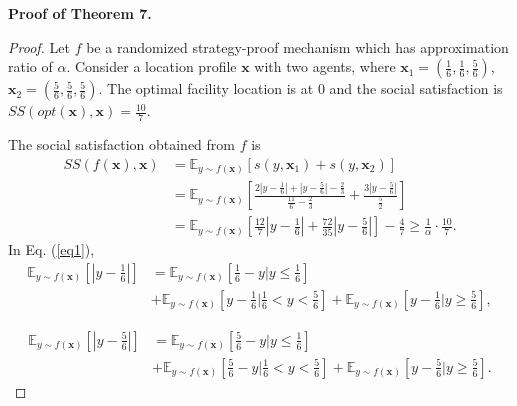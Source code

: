\documentclass[runningheads]{11llncst}
\begin{document}
\noindent
\textbf{Proof of Theorem 7.}
    \begin{proof}
    Let $f$ be a randomized strategy-proof mechanism which has approximation ratio of $\alpha$. Consider a location profile $\textbf{x}$ with two agents, where $\textbf{x}_1=(\frac{1}{6},\frac{1}{6},\frac{5}{6})$, $\textbf{x}_2=(\frac{5}{6},\frac{5}{6},\frac{5}{6})$. The optimal facility location is at 0 and the social satisfaction is $SS(opt(\textbf{x}),\textbf{x})=\frac{10}{7}.$

The social satisfaction  obtained from $f$ is
\begin{equation}\label{eq1}
    \begin{aligned}
        SS(f(\textbf{x}),\textbf{x})&=\mathbb{E}_{y\sim f(\textbf{x})}[s(y,\textbf{x}_1)+s(y,\textbf{x}_2)]\\
        &=\mathbb{E}_{y\sim f(\textbf{x})}\left[\frac{2|y-\frac{1}{6}|+|y-\frac{5}{6}|-\frac{2}{3}}{\frac{11}{6}-\frac{2}{3}}+\frac{3|y-\frac{5}{6}|}{\frac{5}{2}}\right]\\
        &=\mathbb{E}_{y\sim f(\textbf{x})}\left[\frac{12}{7}\left|y-\frac{1}{6}
        \right|+\frac{72}{35}\left|y-\frac{5}{6}\right|\right]-\frac{4}{7}\geq\frac{1}{\alpha}\cdot\frac{10}{7}.
    \end{aligned}
\end{equation}
In Eq. (\ref{eq1}), 
	\begin{equation} \label{eq3}
    \begin{aligned}
        \mathbb{E}_{y\sim f(\textbf{x})}\left[\left|y-\frac{1}{6}\right|\right]&=\mathbb{E}_{y\sim f(\textbf{x})}\left[\frac{1}{6}-y\bigg| y\leq\frac{1}{6}\right]\\
        &+\mathbb{E}_{y\sim f(\textbf{x})}\left[y-\frac{1}{6}\bigg|\frac{1}{6}<y<\frac{5}{6}\right]+\mathbb{E}_{y\sim f(\textbf{x})}\left[y-\frac{1}{6}\bigg|y\geq\frac{5}{6}\right],
    \end{aligned}
		\end{equation}

\begin{equation}\label{eq4}
    \begin{aligned}
       \mathbb{E}_{y\sim f(\textbf{x})}\left[\left|y-\frac{5}{6}\right|\right]
        &=\mathbb{E}_{y\sim f(\textbf{x})}\left[\frac{5}{6}-y\bigg|y\leq\frac{1}{6}\right]\\
        &+\mathbb{E}_{y\sim f(\textbf{x})}\left[\frac{5}{6}-y\bigg|\frac{1}{6}<y<\frac{5}{6}\right]+\mathbb{E}_{y\sim f(\textbf{x})}\left[y-\frac{5}{6}\bigg|y\geq\frac{5}{6}\right].
    \end{aligned}
\end{equation}


\end{proof}
\end{document}
